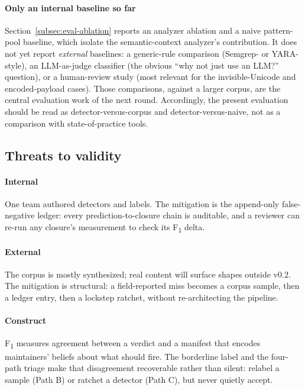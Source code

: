 \paragraph{Only an internal baseline so far} Section~\ref{subsec:eval-ablation}
reports an analyzer ablation and a naive pattern-pool baseline, which
isolate the semantic-context analyzer's contribution. It does not yet
report \emph{external} baselines: a generic-rule comparison (Semgrep- or
YARA-style), an LLM-as-judge classifier (the obvious ``why not just use
an LLM?'' question), or a human-review study (most relevant for the
invisible-Unicode and encoded-payload cases). Those comparisons, against
a larger corpus, are the central evaluation work of the next round.
Accordingly, the present evaluation should be read as
detector-versus-corpus and detector-versus-naive, not as a comparison
with state-of-practice tools.

\subsection{Threats to validity}

\paragraph{Internal} One team authored detectors and labels. The
mitigation is the append-only false-negative ledger: every
prediction-to-closure chain is auditable, and a reviewer can re-run any
closure's measurement to check its F\textsubscript{1} delta.

\paragraph{External} The corpus is mostly synthesized; real content will
surface shapes outside v0.2. The mitigation is structural: a
field-reported miss becomes a corpus sample, then a ledger entry, then a
lockstep ratchet, without re-architecting the pipeline.

\paragraph{Construct} F\textsubscript{1} measures agreement between a
verdict and a manifest that encodes maintainers' beliefs about what
should fire. The borderline label and the four-path triage make that
disagreement recoverable rather than silent: relabel a sample (Path B)
or ratchet a detector (Path C), but never quietly accept.
